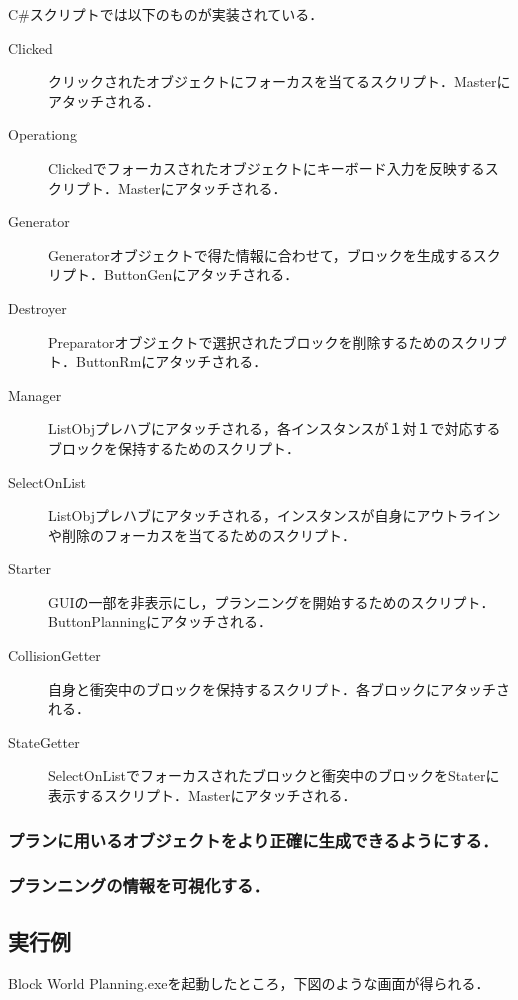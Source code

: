 \documentclass[12pt]{jarticle}
\begin{document}
C\#スクリプトでは以下のものが実装されている．
\begin{description}
\item[Clicked] クリックされたオブジェクトにフォーカスを当てるスクリプト．Masterにアタッチされる．
\item[Operationg] Clickedでフォーカスされたオブジェクトにキーボード入力を反映するスクリプト．Masterにアタッチされる．
\item[Generator] Generatorオブジェクトで得た情報に合わせて，ブロックを生成するスクリプト．ButtonGenにアタッチされる．
\item[Destroyer] Preparatorオブジェクトで選択されたブロックを削除するためのスクリプト．ButtonRmにアタッチされる．
\item[Manager] ListObjプレハブにアタッチされる，各インスタンスが１対１で対応するブロックを保持するためのスクリプト．
\item[SelectOnList] ListObjプレハブにアタッチされる，インスタンスが自身にアウトラインや削除のフォーカスを当てるためのスクリプト．
\item[Starter] GUIの一部を非表示にし，プランニングを開始するためのスクリプト．ButtonPlanningにアタッチされる．
\item[CollisionGetter] 自身と衝突中のブロックを保持するスクリプト．各ブロックにアタッチされる．
\item[StateGetter] SelectOnListでフォーカスされたブロックと衝突中のブロックをStaterに表示するスクリプト．Masterにアタッチされる．
\end{description}

\subsubsection{プランに用いるオブジェクトをより正確に生成できるようにする．}


\subsubsection{プランニングの情報を可視化する．}

\clearpage

\subsection{実行例}
Block World Planning.exeを起動したところ，下図のような画面が得られる．
\end{document}
